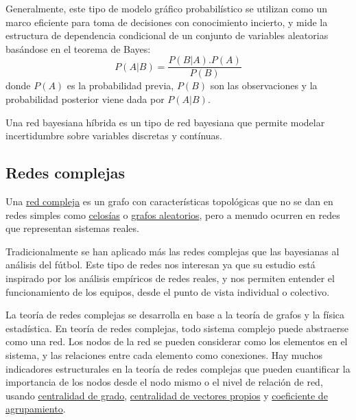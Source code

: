 Generalmente, este tipo de modelo gráfico probabilístico se utilizan como un marco eficiente para
toma de decisiones con conocimiento incierto, y mide la estructura de dependencia condicional
de un conjunto de variables aleatorias basándose en el teorema de Bayes:\\
\begin{equation}
\label{eq:bayes}
P(A|B) = \frac{P(B|A).P(A)}{P(B)}
\end{equation}
donde $P(A)$ es la probabilidad previa, $P(B)$ son las observaciones y la probabilidad posterior viene dada 
por $P(A|B)$\cite{YANG201919}.

\begin{definicion}\label{def:hybrid_BN}
Una red bayesiana híbrida\cite{hybrid-BN} es un tipo de red bayesiana que permite modelar incertidumbre
sobre variables discretas y contínuas.
\end{definicion}

\subsection{Redes complejas}
\begin{definicion}\label{def:CN}
    Una \href{https://en.wikipedia.org/wiki/Complex_network}{red compleja} 
    es un grafo con características topológicas que no se dan 
    en redes simples como \href{https://en.wikipedia.org/wiki/Lattice_(order)}{celosías} o 
    \href{https://mathworld.wolfram.com/RandomGraph.html}{grafos aleatorios}, pero a menudo ocurren en redes que 
    representan sistemas reales. 
\end{definicion}

Tradicionalmente se han aplicado más las redes complejas que las bayesianas al análisis del fútbol\cite{ARRIAZAARDILES2018236}.
Este tipo de redes nos interesan ya que su estudio está inspirado por los análisis empíricos de redes reales, y 
nos permiten entender el funcionamiento de los equipos, desde el punto de vista individual o colectivo.

La teoría de redes complejas se desarrolla en base a la teoría de grafos y la física estadística. En teoría de 
redes complejas, todo sistema complejo puede abstraerse como una red. Los nodos de la red se pueden 
considerar como los elementos en el sistema, y las relaciones
entre cada elemento como conexiones. Hay muchos indicadores estructurales
en la teoría de redes complejas que pueden cuantificar la importancia de los nodos desde el nodo mismo o el
nivel de relación de red, usando \href{https://link.springer.com/10.1007%2F978-1-4419-9863-7_935}{centralidad de grado}, 
\href{https://neo4j.com/docs/graph-data-science/current/algorithms/eigenvector-centrality/}{centralidad de vectores propios} 
y \href{https://en.wikipedia.org/wiki/Clustering_coefficient}{coeficiente de agrupamiento}.
 
